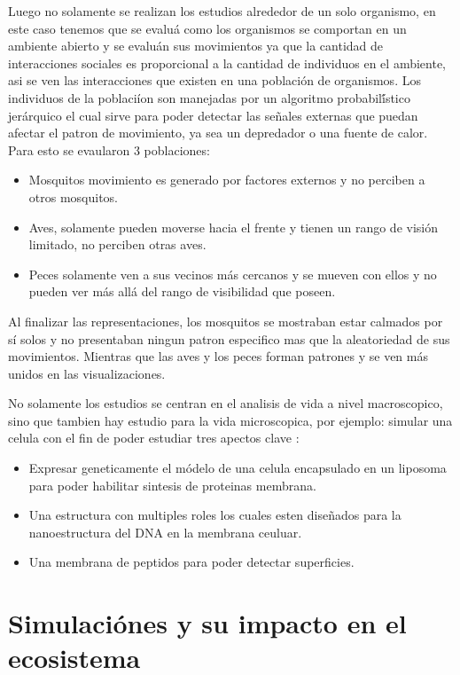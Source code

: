 \documentclass[conference]{IEEEtran}
\begin{document}
Luego no solamente se realizan los estudios alrededor de un solo organismo, en este caso tenemos que se evalu\'a como los organismos se comportan en un ambiente abierto y se evalu\'an sus movimientos ya que la cantidad de interacciones sociales es proporcional a la cantidad de individuos en el ambiente, asi se ven las interacciones que existen en una poblaci\'on de organismos. \cite{ASTK01, PMLC01}
Los individuos de la poblaci\'ion son manejadas por un algoritmo probabil\'ístico jer\'arquico el cual sirve para poder detectar las se\~nales externas que puedan afectar el patron de movimiento, ya sea un depredador o una fuente de calor. 
Para esto se evaularon 3 poblaciones:
\begin{itemize}
\item Mosquitos movimiento es generado por factores externos y no perciben a otros mosquitos.
\item Aves, solamente pueden moverse hacia el frente y tienen un rango de visi\'on limitado, no perciben otras aves.
\item Peces solamente ven a sus vecinos m\'as cercanos y se mueven con ellos y no pueden ver m\'as all\'a del rango de visibilidad que poseen.
\end{itemize}
Al finalizar las representaciones, los mosquitos se mostraban estar calmados por s\'i solos y no presentaban ningun patron especifico mas que la aleatoriedad de sus movimientos. Mientras que las aves y los peces forman patrones y se ven m\'as unidos en las visualizaciones. \cite{ASTK01}

No solamente los estudios se centran en el analisis de vida a nivel macroscopico, sino que tambien hay estudio para la vida microscopica, por ejemplo: simular una celula con el fin de poder estudiar tres apectos clave
\cite{shinji01} :
\begin{itemize}
\item Expresar geneticamente el m\'odelo de una celula encapsulado en un liposoma para poder habilitar sintesis de proteinas membrana. 
\item Una estructura con multiples roles los cuales esten dise\~nados para la nanoestructura del DNA en la membrana ceuluar. 
\item Una membrana de peptidos para poder detectar superficies.
\end{itemize}


\section{Simulaci\'ones y su impacto en el ecosistema}
\end{document}
